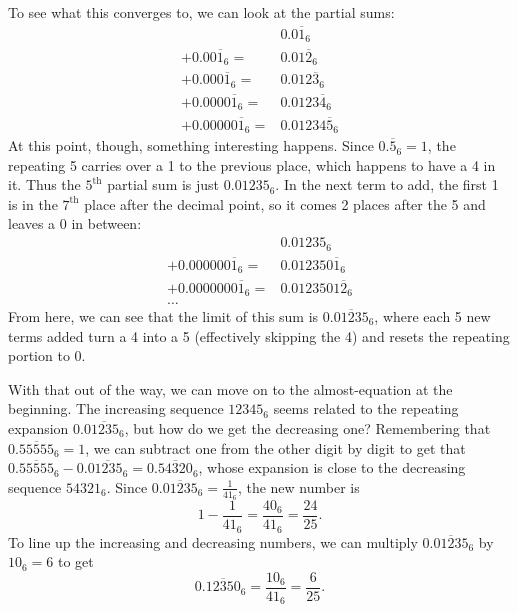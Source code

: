 \documentclass{article}
\begin{document}
To see what this converges to, we can look at the partial sums:
\begin{align*}
  & 0.0\overline{1}_6 \\
  + 0.00\overline{1}_6 =& 0.01\overline{2}_6 \\
  + 0.000\overline{1}_6 =& 0.012\overline{3}_6 \\
  + 0.0000\overline{1}_6 =& 0.0123\overline{4}_6 \\
  + 0.00000\overline{1}_6 =& 0.01234\overline{5}_6
\end{align*}
At this point, though, something interesting happens.
Since $0.\overline{5}_6=1$,
the repeating 5 carries over a 1 to the previous place,
which happens to have a 4 in it.
Thus the $5^\text{th}$ partial sum is just $0.01235_6$.
In the next term to add,
the first 1 is in the $7^\text{th}$ place after the decimal point,
so it comes 2 places after the 5 and leaves a 0 in between:
\begin{align*}
  & 0.01235_6 \\
  + 0.000000\overline{1}_6 =& 0.012350\overline{1}_6 \\
  + 0.0000000\overline{1}_6 =& 0.0123501\overline{2}_6 \\
  \ldots &
\end{align*}
From here, we can see that the limit of this sum is
$0.\overline{01235}_6$,
where each 5 new terms added turn a 4 into a 5
(effectively skipping the 4)
and resets the repeating portion to 0.

With that out of the way, we can move on to the almost-equation at the beginning.
The increasing sequence $12345_6$ seems related to the repeating expansion $0.\overline{01235_6}$,
but how do we get the decreasing one?
Remembering that $0.\overline{55555}_6=1$,
we can subtract one from the other digit by digit
to get that $0.\overline{55555}_6-0.\overline{01235_6}=0.\overline{54320}_6$,
whose expansion is close to the decreasing sequence $54321_6$.
Since $0.\overline{01235}_6=\frac{1}{41_6}$,
the new number is
\[1-\frac{1}{41_6}=\frac{40_6}{41_6}=\frac{24}{25}.\]
To line up the increasing and decreasing numbers,
we can multiply $0.\overline{01235}_6$ by $10_6=6$
to get
\[0.\overline{12350}_6 = \frac{10_6}{41_6} = \frac{6}{25}.\]
\end{document}
